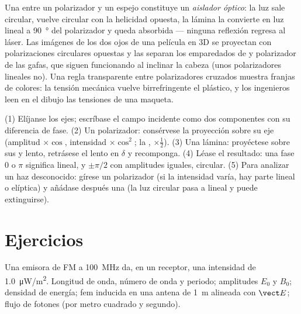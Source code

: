 \begin{example}\label{ex:b2:plane-waves-polarization:plateuses}
Una  entre un polarizador y un espejo constituye
un \emph{aislador óptico}: la luz sale circular, vuelve circular con la
helicidad opuesta, la lámina la convierte en luz lineal a
\qty{90}{\degree} del polarizador y queda absorbida --- ninguna reflexión
regresa al láser. Las imágenes de los dos ojos de una película en 3D se
proyectan con polarizaciones circulares opuestas y las separan los
emparedados de  y polarizador de las gafas, que
siguen funcionando al inclinar la cabeza (unos polarizadores lineales no).
Una regla transparente entre polarizadores cruzados muestra franjas de
colores: la tensión mecánica vuelve birrefringente el plástico, y los
ingenieros leen en el dibujo las tensiones de una maqueta.
\end{example}

\begin{method}\label{met:b2:plane-waves-polarization:method}
(1) Elíjanse los ejes; escríbase el campo incidente como dos componentes
con su diferencia de fase. (2) Un polarizador: consérvese la proyección
sobre su eje (amplitud $\times\cos$, intensidad $\times\cos^2$; la ,
$\times\tfrac12$). (3) Una lámina: proyéctese sobre sus  y
lento, retrásese el lento en $\delta$ y recomponga. (4) Léase el resultado:
una fase $0$ o $\pi$ significa lineal, y $\pm\pi/2$ con amplitudes iguales,
circular. (5) Para analizar un haz desconocido: gírese un polarizador (si
la intensidad varía, hay parte lineal o elíptica) y añádase después una
 (la luz circular pasa a lineal y puede extinguirse).
\end{method}

\section{Ejercicios}

\begin{exercise}[$\star$]\label{exo:b2:plane-waves-polarization:1}
Una emisora de FM a \qty{100}{MHz} da, en un receptor, una intensidad de
\qty{1.0}{\micro W/m^2}. Longitud de onda, número de onda y periodo;
amplitudes $E_0$ y $B_0$; densidad de energía; fem inducida en una antena
de \qty{1}{m} alineada con $\vect E$; flujo de fotones (por metro cuadrado y segundo).
\end{exercise}

